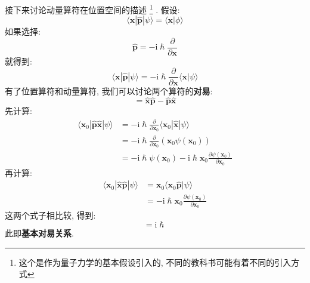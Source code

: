         接下来讨论动量算符在位置空间的描述
        \footnote{这个是作为量子力学的基本假设引入的, 不同的教科书可能有着不同的引入方式}
        . 假设: 
        \begin{equation}
            \langle \bm{x} |\hat{\bm{p}} | \psi \rangle
            = \langle \bm{x} | \phi \rangle
        \end{equation}
        如果选择: 
        \begin{equation}
            \hat{\bm{p}} = -\mathrm{i}\hslash \frac {\partial }{\partial \bm{x}}
        \end{equation}
        就得到: 
        \begin{equation}
            \langle \bm{x} |\hat{\bm{p}} | \psi \rangle = -\mathrm{i}\hslash \frac {\partial }{\partial \bm{x}}\langle \bm{x} | \psi \rangle
        \end{equation}
        有了位置算符和动量算符, 我们可以讨论两个算符的\textbf{对易}: 
        \begin{equation}
            [\hat{\bm{x}},\hat{\bm{p}}] = \hat{\bm{x}}\hat{\bm{p}} - \hat{\bm{p}}\hat{\bm{x}}
        \end{equation}
        先计算: 
        \begin{equation}\begin{aligned}
            \langle \bm{x}_0 |\hat{\bm{p}}\hat{\bm{x}} | \psi \rangle &= -\mathrm{i}\hslash \frac {\partial}{\partial \bm{x}_0} \langle \bm{x}_0 |\hat{\bm{x}} | \psi \rangle\\
            &= -\mathrm{i}\hslash \frac {\partial}{\partial \bm{x}_0} (\bm{x}_0\psi(\bm{x}_0))\\
            &= -\mathrm{i}\hslash \psi(\bm{x}_0) - \mathrm{i}\hslash \bm{x}_0 \frac {\partial \psi(\bm{x}_0)}{\partial \bm{x}_0}
        \end{aligned}\end{equation}
        再计算: 
        \begin{equation}\begin{aligned}
            \langle \bm{x}_0 |\hat{\bm{x}} \hat{\bm{p}} | \psi \rangle &= \bm{x}_0 \langle \bm{x}_0 \hat{\bm{p}} | \psi \rangle\\
            &= -\mathrm{i}\hslash \bm{x}_0 \frac {\partial \psi(\bm{x}_0)}{\partial \bm{x}_0}
        \end{aligned}\end{equation}
        这两个式子相比较, 得到: 
        \begin{equation}
            [\hat{\bm{x}},\hat{\bm{p}}] = \mathrm{i}\hslash
        \end{equation}
        此即\textbf{基本对易关系}.

